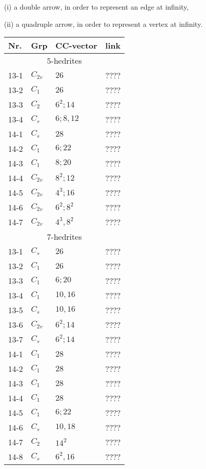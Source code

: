 \documentclass[12pt]{article}
\begin{document}
(i) a double arrow, in order to represent an edge at infinity,

(ii) a quadruple arrow, in order to represent a vertex at infinity.




\begin{table}
\begin{center}
{\small
\begin{minipage}{6cm}
\begin{tabular}{||l|l|l|l||}
\hline
Nr.	&Grp 	&CC-vector	&link\\\hline
\multicolumn{4}{||c||}{$5$-hedrites}\\\hline
13-1	&$C_{2v}$	&$26$		&????\\
13-2	&$C_1$	&$26$		&????\\
13-3	&$C_2$	&$6^2; 14$	&????\\
13-4	&$C_s$	&$6; 8, 12$	&????\\\hline
14-1	&$C_s$	&$28$		&????\\
14-2	&$C_1$	&$6; 22$		&????\\
14-3	&$C_1$	&$8; 20$		&????\\
14-4	&$C_{2v}$	&$8^2; 12$	&????\\
14-5	&$C_{2v}$	&$4^3; 16$	&????\\
14-6	&$C_{2v}$	&$6^2; 8^2$	&????\\
14-7	&$C_{2v}$	&$4^3, 8^2$	&????\\\hline
\hline
\multicolumn{4}{||c||}{$7$-hedrites}\\\hline
13-1	&$C_s$	&$26$		&????\\
13-2	&$C_1$	&$26$		&????\\
13-3	&$C_1$	&$6; 20$		&????\\
13-4	&$C_1$	&$10, 16$		&????\\
13-5	&$C_s$	&$10, 16$		&????\\
13-6	&$C_{2v}$	&$6^2; 14$	&????\\
13-7	&$C_{s}$	&$6^2; 14$	&????\\\hline
14-1	&$C_1$	&$28$		&????\\
14-2	&$C_1$	&$28$		&????\\
14-3	&$C_1$	&$28$		&????\\
14-4	&$C_1$	&$28$		&????\\
14-5	&$C_1$	&$6; 22$		&????\\
14-6	&$C_s$	&$10, 18$		&????\\
14-7	&$C_2$	&$14^2$		&????\\
14-8	&$C_s$	&$6^2, 16$	&????\\

\end{tabular}
\end{minipage}}
\end{center}
\end{table}
\end{document}
